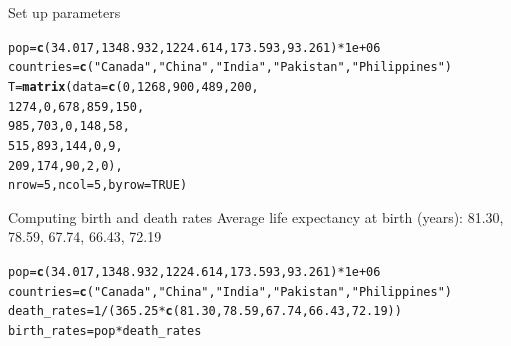 \documentclass[aspectratio=169]{beamer}\usepackage[]{graphicx}\usepackage[]{xcolor}
\makeatletter
\newcommand{\hlnum}[1]{\textcolor[rgb]{0.686,0.059,0.569}{#1}}%
\newcommand{\hlsng}[1]{\textcolor[rgb]{0.192,0.494,0.8}{#1}}%
\newcommand{\hlopt}[1]{\textcolor[rgb]{0,0,0}{#1}}%
\newcommand{\hldef}[1]{\textcolor[rgb]{0.345,0.345,0.345}{#1}}%
\newcommand{\hlkwb}[1]{\textcolor[rgb]{0.69,0.353,0.396}{#1}}%
\newcommand{\hlkwc}[1]{\textcolor[rgb]{0.333,0.667,0.333}{#1}}%
\newcommand{\hlkwd}[1]{\textcolor[rgb]{0.737,0.353,0.396}{\textbf{#1}}}%
\newenvironment{kframe}{%
 \def\at@end@of@kframe{}%
 \ifinner\ifhmode%
  \def\at@end@of@kframe{\end{minipage}}%
  \begin{minipage}{\columnwidth}%
 \fi\fi%
 \def\FrameCommand##1{\hskip\@totalleftmargin \hskip-\fboxsep
 \colorbox{shadecolor}{##1}\hskip-\fboxsep
     \hskip-\linewidth \hskip-\@totalleftmargin \hskip\columnwidth}%
 \MakeFramed {\advance\hsize-\width
   \@totalleftmargin\z@ \linewidth\hsize
   \@setminipage}}%
 {\par\unskip\endMakeFramed%
 \at@end@of@kframe}
\newenvironment{knitrout}{}{} %
\makeatother
\begin{document}
\begin{frame}[fragile]{Set up parameters}
\begin{knitrout}
\color{fgcolor}\begin{kframe}
\begin{alltt}
\hldef{pop} \hlkwb{=} \hlkwd{c}\hldef{(}\hlnum{34.017}\hldef{,} \hlnum{1348.932}\hldef{,} \hlnum{1224.614}\hldef{,} \hlnum{173.593}\hldef{,} \hlnum{93.261}\hldef{)} \hlopt{*} \hlnum{1e+06}
\hldef{countries} \hlkwb{=} \hlkwd{c}\hldef{(}\hlsng{"Canada"}\hldef{,} \hlsng{"China"}\hldef{,} \hlsng{"India"}\hldef{,} \hlsng{"Pakistan"}\hldef{,} \hlsng{"Philippines"}\hldef{)}
\hldef{T} \hlkwb{=} \hlkwd{matrix}\hldef{(}\hlkwc{data} \hldef{=} \hlkwd{c}\hldef{(}\hlnum{0}\hldef{,} \hlnum{1268}\hldef{,} \hlnum{900}\hldef{,} \hlnum{489}\hldef{,} \hlnum{200}\hldef{,}
                    \hlnum{1274}\hldef{,} \hlnum{0}\hldef{,} \hlnum{678}\hldef{,} \hlnum{859}\hldef{,} \hlnum{150}\hldef{,}
                    \hlnum{985}\hldef{,} \hlnum{703}\hldef{,} \hlnum{0}\hldef{,} \hlnum{148}\hldef{,} \hlnum{58}\hldef{,}
                    \hlnum{515}\hldef{,} \hlnum{893}\hldef{,} \hlnum{144}\hldef{,} \hlnum{0}\hldef{,} \hlnum{9}\hldef{,}
                    \hlnum{209}\hldef{,} \hlnum{174}\hldef{,} \hlnum{90}\hldef{,} \hlnum{2}\hldef{,} \hlnum{0}\hldef{),}
           \hlkwc{nrow} \hldef{=} \hlnum{5}\hldef{,} \hlkwc{ncol} \hldef{=} \hlnum{5}\hldef{,} \hlkwc{byrow} \hldef{=} \hlnum{TRUE}\hldef{)}
\end{alltt}
\end{kframe}
\end{knitrout}
\end{frame}

\begin{frame}[fragile]{Computing birth and death rates}
Average life expectancy at birth (years): 81.30, 78.59, 67.74, 66.43, 72.19
\begin{knitrout}
\color{fgcolor}\begin{kframe}
\begin{alltt}
\hldef{pop} \hlkwb{=} \hlkwd{c}\hldef{(}\hlnum{34.017}\hldef{,} \hlnum{1348.932}\hldef{,} \hlnum{1224.614}\hldef{,} \hlnum{173.593}\hldef{,} \hlnum{93.261}\hldef{)} \hlopt{*} \hlnum{1e+06}
\hldef{countries} \hlkwb{=} \hlkwd{c}\hldef{(}\hlsng{"Canada"}\hldef{,} \hlsng{"China"}\hldef{,} \hlsng{"India"}\hldef{,} \hlsng{"Pakistan"}\hldef{,} \hlsng{"Philippines"}\hldef{)}
\hldef{death_rates} \hlkwb{=} \hlnum{1}\hlopt{/}\hldef{(}\hlnum{365.25}\hlopt{*}\hlkwd{c}\hldef{(}\hlnum{81.30}\hldef{,} \hlnum{78.59}\hldef{,} \hlnum{67.74}\hldef{,} \hlnum{66.43}\hldef{,} \hlnum{72.19}\hldef{))}
\hldef{birth_rates} \hlkwb{=} \hldef{pop}\hlopt{*}\hldef{death_rates}
\end{alltt}
\end{kframe}
\end{knitrout}
\end{frame}
\end{document}
